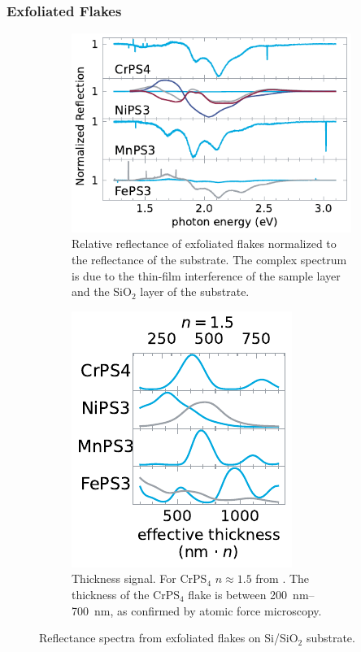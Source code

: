 \documentclass[
	twoside,
	parskip=half,
	a4paper,
]{scrbook}
\begin{document}
\subsubsection*{Exfoliated Flakes}
\begin{figure}
	\centering
	\begin{subfigure}[c]{3.5in}
		\centering
		\includegraphics{../figures/2024-04-10 normalized reflection spectra.pdf}
		\caption{Relative reflectance of exfoliated flakes normalized to the reflectance of the substrate.
		The complex spectrum is due to the thin-film interference of the sample layer and the SiO$_2$ layer of the substrate.}
		\label{fig:reflection flakes}
	\end{subfigure}
	\begin{subfigure}[c]{2in}
		\centering
		\includegraphics{../figures/2024-03-14 thickness flakes.pdf}
		\caption{
		Thickness signal.
		For CrPS$_4$  $n\approx1.5$ from \cite{CrPS4_refrative}. 
		The thickness of the CrPS$_4$ flake is between \SIrange{200}{700}{nm}, as confirmed by atomic force microscopy.
	}
		\label{fig:thickness flakes}
	\end{subfigure}
	\caption{Reflectance spectra from exfoliated flakes on Si/SiO$_2$ substrate.}
\end{figure}
\end{document}
